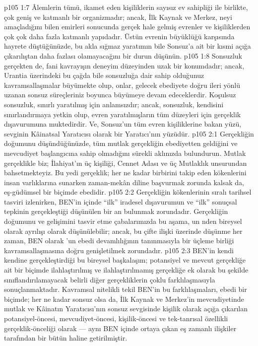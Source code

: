\vs p105 1:7 Âlemlerin tümü, ikamet eden kişiliklerin sayısız ev sahipliği ile birlikte, çok geniş ve katmanlı bir organizmadır; ancak, İlk Kaynak ve Merkez, neyi amaçladığını bilen emirleri sonucunda gerçek hale gelmiş evrenler ve kişiliklerden çok çok daha fazla katmanlı yapıdadır. Üstün evrenin büyüklüğü karşısında hayrete düştüğünüzde, bu akla sığmaz yaratımın bile Sonsuz’a ait bir kısmi açığa çıkarılıştan daha fazlası olamayacağını bir durun düşünün.
\vs p105 1:8 Sonsuzluk gerçekten de, fani kavrayışın deneyim düzeyinden uzak bir konumdadır; ancak, Urantia üzerindeki bu çağda bile sonsuzluğa dair sahip olduğunuz kavramsallaşmalar büyümekte olup, onlar, gelecek ebediyete doğru ileri yönlü uzanan sonsuz süreçleriniz boyunca büyümeye devam edeceklerdir. Koşulsuz sonsuzluk, sınırlı yaratılmış için anlamsızdır; ancak, sonsuzluk, kendisini sınırlandırmaya yetkin olup, evren yaratılmışların tüm düzeyleri için gerçeklik dışavurumuna muktedirdir. Ve, Sonsuz’un tüm evren kişiliklerine bakan yüzü, sevginin Kâinatsal Yaratıcısı olarak bir Yaratıcı’nın yüzüdür.
\vs p105 2:1 Gerçekliğin doğumunu düşündüğünüzde, tüm mutlak gerçekliğin ebediyetten geldiğini ve mevcudiyet başlangıcına sahip olmadığını sürekli aklınızda bulundurun. Mutlak gerçeklikle biz; İlahiyat’ın üç kişiliği, Cennet Adası ve üç Mutlaklık unsurundan bahsetmekteyiz. Bu yedi gerçeklik; her ne kadar birbirini takip eden kökenlerini insan varlıklarına sunarken zaman\hyp{}mekân diline başvurmak zorunda kalsak da, eş\hyp{}güdümsel bir biçimde ebedidir.
\vs p105 2:2 Gerçekliğin kökenlerinin sıralı tarihsel tasviri izlenirken, BEN’in içinde “ilk” iradesel dışavurumun ve “ilk” sonuçsal tepkinin gerçekleştiği düşünülen bir an bulunmak zorundadır. Gerçekliğin doğumunu ve gelişimini tasvir etme çabalarımızda bu aşama, un nden bireysel olarak ayrılışı olarak düşünülebilir; ancak, bu çifte ilişki üzerinde düşünme her zaman, BEN olarak ’un ebedi devamlılığının tanınmasıyla bir üçleme birliği kavramsallaşmasına doğru genişletilmek zorundadır.
\vs p105 2:3 BEN’in kendi kendine gerçekleştirdiği bu bireysel başkalaşım; potansiyel ve mevcut gerçekliğe ait bir biçimde ilahlaştırılmış ve ilahlaştırılmamış gerçekliğe ek olarak bu şekilde sınıflandırılamayacak belirli diğer gerçekliklerin çoklu farklılaşmasıyla sonuçlanmaktadır. Kavramsal nitelikli tekil BEN’in bu farklılaşmaları, ebedi bir biçimde; her ne kadar sonsuz olsa da, İlk Kaynak ve Merkez’in mevcudiyetinde mutlak ve Kâinatın Yaratıcısı’nın sonsuz sevgisinde kişilik olarak açığa çıkarılan potansiyel\hyp{}öncesi, mevcudiyet\hyp{}öncesi, kişilik\hyp{}öncesi ve tek\hyp{}tanrısal özellikli gerçeklik\hyp{}önceliği olarak --- aynı BEN içinde ortaya çıkan eş zamanlı ilişkiler tarafından bir bütün haline getirilmiştir.

